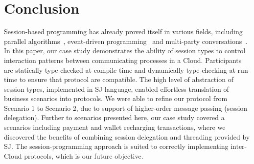 \documentclass[10pt]{llncs}
\begin{document}
\section{Conclusion}
\label{sect:conclusion}
Session-based programming has already proved itself in various fields, including parallel algorithms~\cite{sj-parallel}, event-driven programming~\cite{event-driven-sj} and multi-party conversations~\cite{sj-business-protocols}.
In this paper, our case study demonstrates the ability of session types to control interaction patterns between communicating processes in a Cloud.
Participants are statically type-checked at compile time and dynamically type-checking at run-time to ensure that protocol are compatible.
The high level of abstraction of session types, implemented in SJ language, enabled effortless translation of business scenarios into protocols.
We were able to refine our protocol from Scenario 1 to Scenario 2, due to support of higher-order message passing (session delegation). %
Further to scenarios presented here, our case study covered a scenarios including payment and wallet recharging transactions, %
where we discovered the benefits of combining session delegation and threading provided by SJ.
The session-programming approach is suited to correctly implementing inter-Cloud protocols, which is our future objective. %


%
\label{sect:bib}

%
%
%


\appendix




\end{document}
